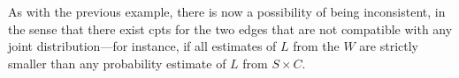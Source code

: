 \documentclass{article}
\numberwithin{equation}{section}
\begin{document}
\begin{notfocus}
\begin{example}
		As with the previous example, there is now a possibility of being
		inconsistent, in the sense that there exist cpts for the two edges
		that are not compatible with any joint distribution---for instance, if
		all estimates of $L$ from the $W$ are strictly smaller than any
		probability estimate of $L$ from $S \times C$. 
%	
	\end{example}
	

\end{notfocus}
\end{document}
